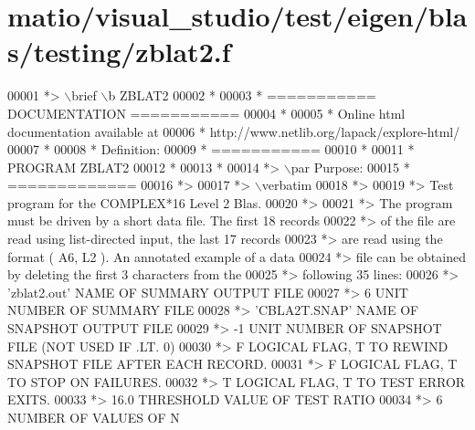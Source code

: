 \hypertarget{matio_2visual__studio_2test_2eigen_2blas_2testing_2zblat2_8f_source}{}\section{matio/visual\+\_\+studio/test/eigen/blas/testing/zblat2.f}
\label{matio_2visual__studio_2test_2eigen_2blas_2testing_2zblat2_8f_source}

\begin{DoxyCode}
00001 \textcolor{comment}{*> \(\backslash\)brief \(\backslash\)b ZBLAT2}
00002 \textcolor{comment}{*}
00003 \textcolor{comment}{*  =========== DOCUMENTATION ===========}
00004 \textcolor{comment}{*}
00005 \textcolor{comment}{* Online html documentation available at }
00006 \textcolor{comment}{*            http://www.netlib.org/lapack/explore-html/ }
00007 \textcolor{comment}{*}
00008 \textcolor{comment}{*  Definition:}
00009 \textcolor{comment}{*  ===========}
00010 \textcolor{comment}{*}
00011 \textcolor{comment}{*       PROGRAM ZBLAT2}
00012 \textcolor{comment}{* }
00013 \textcolor{comment}{*}
00014 \textcolor{comment}{*> \(\backslash\)par Purpose:}
00015 \textcolor{comment}{*  =============}
00016 \textcolor{comment}{*>}
00017 \textcolor{comment}{*> \(\backslash\)verbatim}
00018 \textcolor{comment}{*>}
00019 \textcolor{comment}{*> Test program for the COMPLEX*16       Level 2 Blas.}
00020 \textcolor{comment}{*>}
00021 \textcolor{comment}{*> The program must be driven by a short data file. The first 18 records}
00022 \textcolor{comment}{*> of the file are read using list-directed input, the last 17 records}
00023 \textcolor{comment}{*> are read using the format ( A6, L2 ). An annotated example of a data}
00024 \textcolor{comment}{*> file can be obtained by deleting the first 3 characters from the}
00025 \textcolor{comment}{*> following 35 lines:}
00026 \textcolor{comment}{*> 'zblat2.out'      NAME OF SUMMARY OUTPUT FILE}
00027 \textcolor{comment}{*> 6                 UNIT NUMBER OF SUMMARY FILE}
00028 \textcolor{comment}{*> 'CBLA2T.SNAP'     NAME OF SNAPSHOT OUTPUT FILE}
00029 \textcolor{comment}{*> -1                UNIT NUMBER OF SNAPSHOT FILE (NOT USED IF .LT. 0)}
00030 \textcolor{comment}{*> F        LOGICAL FLAG, T TO REWIND SNAPSHOT FILE AFTER EACH RECORD.}
00031 \textcolor{comment}{*> F        LOGICAL FLAG, T TO STOP ON FAILURES.}
00032 \textcolor{comment}{*> T        LOGICAL FLAG, T TO TEST ERROR EXITS.}
00033 \textcolor{comment}{*> 16.0     THRESHOLD VALUE OF TEST RATIO}
00034 \textcolor{comment}{*> 6                 NUMBER OF VALUES OF N}

\end{DoxyCode}
